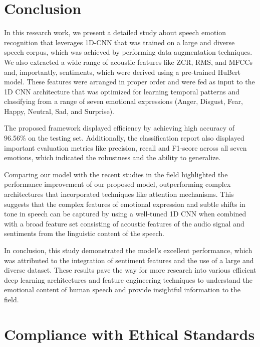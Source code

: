 \documentclass[iicol,sn-mathphys-num]{sn-jnl}%
\theoremstyle{thmstyleone}%
\theoremstyle{thmstyletwo}%
\theoremstyle{thmstylethree}%
\begin{document}
\section{Conclusion}\label{sec5}
In this research work, we present a detailed study about speech emotion recognition that leverages 1D-CNN that was trained on a large and diverse speech corpus, which was achieved by performing data augmentation techniques. We also extracted a wide range of acoustic features like ZCR, RMS, and MFCCs and, importantly, sentiments, which were derived using a pre-trained HuBert model. These features were arranged in proper order and were fed as input to the 1D CNN architecture that was optimized for learning temporal patterns and classifying from a range of seven emotional expressions (Anger, Disgust, Fear, Happy, Neutral, Sad, and Surprise). 

The proposed framework displayed efficiency by achieving high accuracy of 96.56\% on the testing set. Additionally, the classification report also displayed important evaluation metrics like precision, recall and F1-score across all seven emotions, which indicated the robustness and the ability to generalize. 

Comparing our model with the recent studies in the field highlighted the performance improvement of our proposed model, outperforming complex architectures that incorporated techniques like attention mechanisms. This suggests that the complex features of emotional expression and subtle shifts in tone in speech can be captured by using a well-tuned 1D CNN when combined with  a broad feature set consisting of acoustic features of the audio signal and sentiments from the linguistic content of the speech.

In conclusion, this study demonstrated the model's excellent performance, which was attributed to the integration of sentiment features and the use of a large and diverse dataset. These results pave the way for more research into various efficient deep learning architectures and feature engineering techniques to understand the emotional content of human speech and provide insightful information to the field.


\section*{\normalsize Compliance with Ethical Standards}
\end{document}
